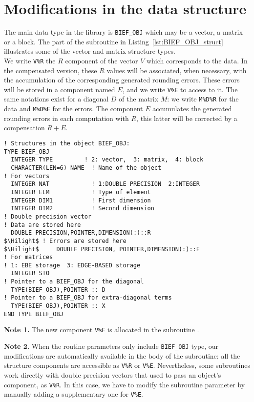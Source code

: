 \section{Modifications in the data structure }
\label{sec:imple_data}
%
The main data type in the \bief library is
\texttt{BIEF\_OBJ} which may be a vector, a matrix or a block.
The part of the subroutine  in
Listing~\ref{lst:BIEF_OBJ_struct}
illustrates some of the vector and matrix structure types.\\
%
We write \texttt{V\%R} the $R$ component of the vector $V$
which corresponds to the data.
In the compensated version, these $R$ values will be associated,
when necessary, with the accumulation of the corresponding generated rounding errors.
These errors will be stored in a component named $E$, and
we write \texttt{V\%E} to access to it.
The same notations exist for a diagonal $D$ of the matrix $M$:
we write \texttt{M\%D\%R} for the data and \texttt{M\%D\%E} for the errors.
The component $E$ accumulates the generated rounding errors in each computation with
$R$, this latter will be corrected by a compensation $R+E$.
%
\begin{lstlisting}[language=TelFortran,
caption={The BIEF\_OBJ structure in \telfile{BIEF\_DEF}},
label={lst:BIEF_OBJ_struct},escapechar=\$]
! Structures in the object BIEF_OBJ:
TYPE BIEF_OBJ
  INTEGER TYPE         ! 2: vector,  3: matrix,  4: block
  CHARACTER(LEN=6) NAME  ! Name of the object
! For vectors
  INTEGER NAT            ! 1:DOUBLE PRECISION  2:INTEGER
  INTEGER ELM            ! Type of element
  INTEGER DIM1           ! First dimension
  INTEGER DIM2           ! Second dimension
! Double precision vector
! Data are stored here
  DOUBLE PRECISION,POINTER,DIMENSION(:)::R
$\Hilight$ ! Errors are stored here
$\Hilight$     DOUBLE PRECISION, POINTER,DIMENSION(:)::E
! For matrices
! 1: EBE storage  3: EDGE-BASED storage
  INTEGER STO
! Pointer to a BIEF_OBJ for the diagonal
  TYPE(BIEF_OBJ),POINTER :: D
! Pointer to a BIEF_OBJ for extra-diagonal terms
  TYPE(BIEF_OBJ),POINTER :: X
END TYPE BIEF_OBJ
\end{lstlisting}
%
%
\begin{description}
\item \textbf{Note 1.} The new component \texttt{V\%E} is allocated in the
subroutine .
%
\item \textbf{Note 2.} When the routine parameters only include \texttt{BIEF\_OBJ} type,
our modifications are automatically available in the body of the subroutine:
all the structure components are accessible as \texttt{V\%R} or \texttt{V\%E}.
Nevertheless, some subroutines work directly with double precision vectors that
used to pass an object's component, as \texttt{V\%R}.
In this case, we have to modify the subroutine parameter by manually
adding a supplementary one for \texttt{V\%E}.
\end{description}
%
